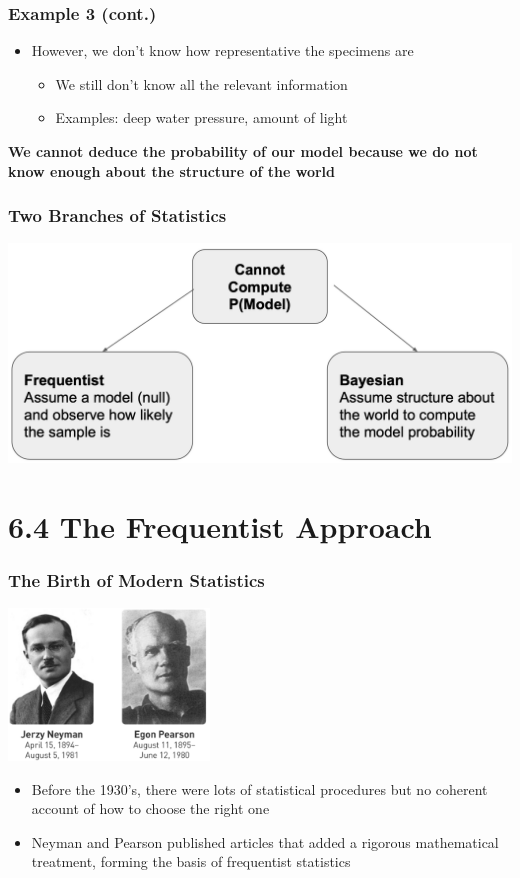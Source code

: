 \documentclass[12pt, block=fill]{beamer}
\begin{document}
\begin{frame}

\frametitle{Example 3 (cont.)}
  
    \begin{itemize}
        \item However, we don't know how representative the specimens are
        \begin{itemize}
            \item We still don't know all the relevant information
            \item Examples: deep water pressure, amount of light
        \end{itemize}
  \end{itemize}    
  \textbf{We cannot deduce the probability of our model because we do not know enough about the structure of the world} 
\end{frame}

\begin{frame}
  \frametitle{Two Branches of Statistics }
  \centering
  \includegraphics[width=.9\linewidth]{./figures/two_worlds}
\end{frame}

\section{6.4 The Frequentist Approach}

\begin{frame}
  \frametitle{The Birth of Modern Statistics}
    \begin{center}
        \includegraphics[width=0.4\textwidth]{figures/neyman_and_pearson.png}     
    \end{center}

  \begin{itemize}
      \item Before the 1930's, there were lots of statistical procedures but no coherent account of how to choose the right one
      \item Neyman and Pearson published articles that added a rigorous mathematical treatment, forming the basis of frequentist statistics
  \end{itemize}
\end{frame}
\end{document}

